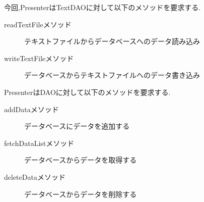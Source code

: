 \documentclass[12pt]{jarticle}
\begin{document}
\noindent
今回,PresenterはTextDAOに対して以下のメソッドを要求する.
\begin{description}
    \item[readTextFileメソッド] テキストファイルからデータベースへのデータ読み込み
    \item[writeTextFileメソッド] データベースからテキストファイルへのデータ書き込み
\end{description}
PresenterはDAOに対して以下のメソッドを要求する.
\begin{description}
    \item[addDataメソッド] データベースにデータを追加する
    \item[fetchDataListメソッド] データベースからデータを取得する
    \item[deleteDataメソッド] データベースからデータを削除する
\end{description}
\end{document}
